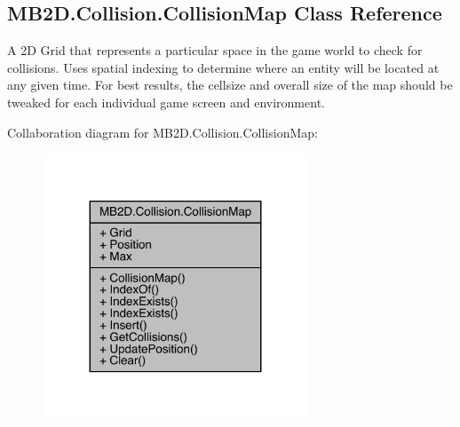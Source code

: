 \hypertarget{class_m_b2_d_1_1_collision_1_1_collision_map}{}\subsection{M\+B2\+D.\+Collision.\+Collision\+Map Class Reference}
\label{class_m_b2_d_1_1_collision_1_1_collision_map}


A 2D Grid that represents a particular space in the game world to check for collisions. Uses spatial indexing to determine where an entity will be located at any given time. For best results, the cellsize and overall size of the map should be tweaked for each individual game screen and environment.  




Collaboration diagram for M\+B2\+D.\+Collision.\+Collision\+Map\+:
\nopagebreak
\begin{figure}[H]
\begin{center}
\leavevmode
\includegraphics[width=224pt]{class_m_b2_d_1_1_collision_1_1_collision_map__coll__graph}
\end{center}
\end{figure}
